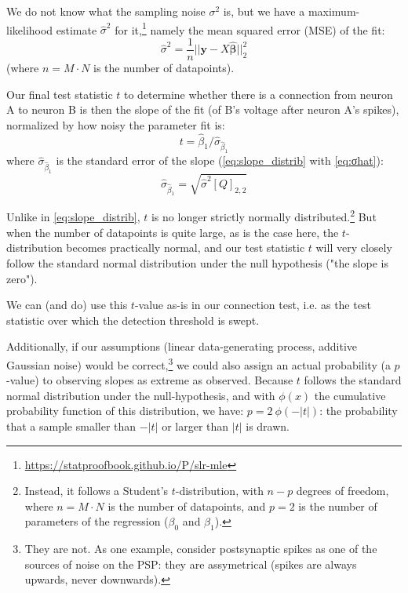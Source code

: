 We do not know what the sampling noise $σ^2$ is, but we have a maximum-likelihood estimate $\hat{σ}^2$ for it,\footnote{\url{https://statproofbook.github.io/P/slr-mle}} namely the mean squared error (MSE) of the fit:
\begin{equation}\label{eq:σhat}
    \hat{σ}^2 = \frac{1}{n} || \bm{y} - X \bm{\hat{β}} ||_2^2
\end{equation}
(where $n = M · N$ is the number of datapoints).

Our final test statistic $t$ to determine whether there is a connection from neuron A
to neuron B is then the slope of the fit (of B's voltage after neuron A's spikes), normalized by how noisy the parameter fit is:
\begin{equation} \label{eq:linreg-tstat}
    t = \hat{β}_1 / \hat{σ}_{\hat{β}_1}
\end{equation}
where $\hat{σ}_{\hat{β}_1}$ is the standard error of the slope (\cref{eq:slope_distrib} with \cref{eq:σhat}):
\begin{equation} \label{eq:linreg-stderr-β}
    \hat{σ}_{\hat{β}_1} = \sqrt{\hat{σ}^2 [Q]_{2,2}}
\end{equation}

Unlike in \cref{eq:slope_distrib}, $t$ is no longer strictly normally distributed.\footnote{
    Instead, it follows a Student's $t$-distribution, with $n - p$ degrees of freedom, where $n = M · N$ is the number of datapoints, and $p = 2$ is the number of parameters of the regression ($β_0$ and $β_1$).
}
But when the number of datapoints is quite large, as is the case here, the $t$-distribution becomes practically normal, and our test statistic $t$ will very closely follow the standard normal distribution under the null hypothesis ("the slope is zero").

We can (and do) use this $t$-value as-is in our connection test, i.e. as the test statistic over which the detection threshold is swept.

Additionally, if our assumptions (linear data-generating process, additive Gaussian noise) would be correct,\footnote{They are not. As one example, consider postsynaptic spikes as one of the sources of noise on the PSP: they are assymetrical (spikes are always upwards, never downwards).}
we could also assign an actual probability (a $p$-value) to observing slopes as extreme as observed. Because $t$ follows the standard normal distribution under the null-hypothesis, and with $\phi(x)$ the cumulative probability function of this distribution, we have: $p = 2\ \phi(-|t|)$: the probability that a sample smaller than $-|t|$ or larger than $|t|$ is drawn.

